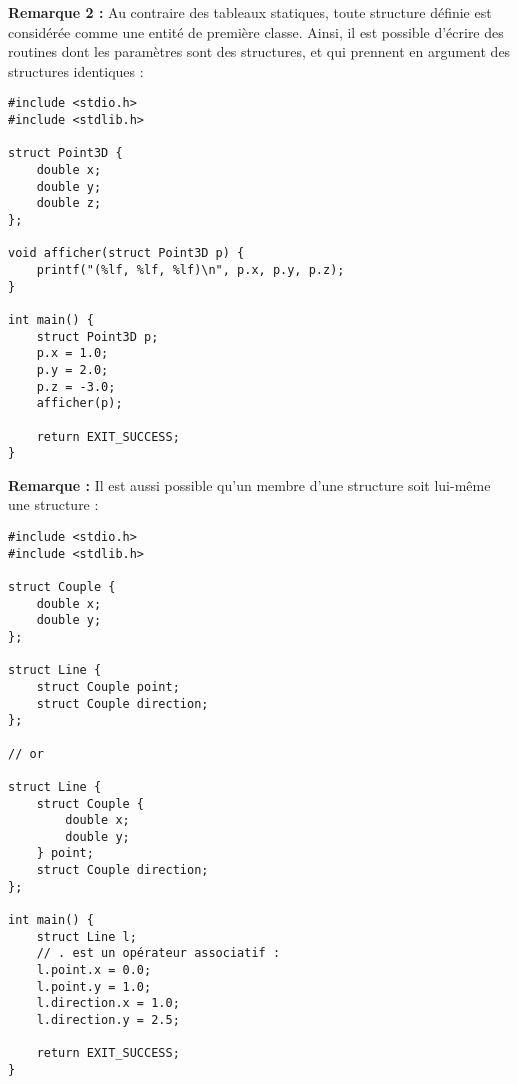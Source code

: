 \documentclass[../../../main.tex]{subfiles}
\begin{document}
\textbf{Remarque 2 :} Au contraire des tableaux statiques, toute structure définie est considérée comme une entité de première classe. Ainsi, il est possible d'écrire des routines dont les paramètres sont des structures, et qui prennent en argument des structures identiques :
\begin{verbatim}
#include <stdio.h>
#include <stdlib.h>

struct Point3D {
	double x;
	double y;
	double z;
};

void afficher(struct Point3D p) {
	printf("(%lf, %lf, %lf)\n", p.x, p.y, p.z);
}

int main() {
	struct Point3D p;
	p.x = 1.0;
	p.y = 2.0;
	p.z = -3.0;
	afficher(p);

	return EXIT_SUCCESS;
}
\end{verbatim}
\textbf{Remarque :} Il est aussi possible qu'un membre d'une structure soit lui-même une structure :
\begin{verbatim}
#include <stdio.h>
#include <stdlib.h>

struct Couple {
	double x;
	double y;
};

struct Line {
	struct Couple point;
	struct Couple direction;
};

// or

struct Line {
	struct Couple {
		double x;
		double y;
	} point;
	struct Couple direction;
};

int main() {
	struct Line l;
	// . est un opérateur associatif :
	l.point.x = 0.0;
	l.point.y = 1.0;
	l.direction.x = 1.0;
	l.direction.y = 2.5;

	return EXIT_SUCCESS;
}
\end{verbatim}
\end{document}
